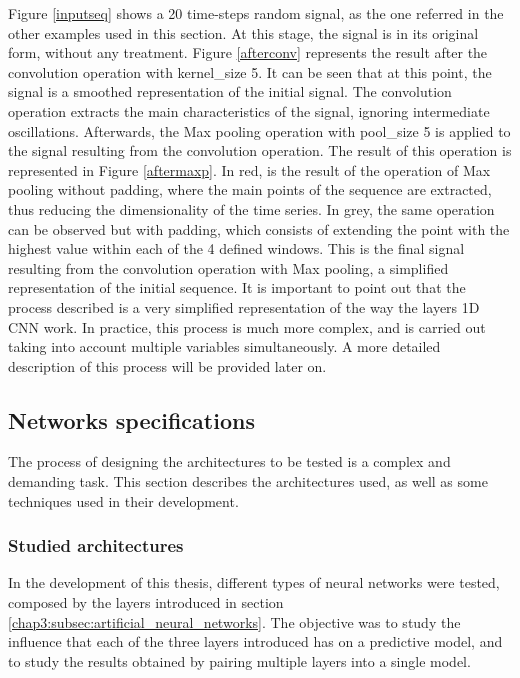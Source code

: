 Figure \ref{inputseq} shows a 20 time-steps random signal, as the one referred in the other examples used in this section. At this stage, the signal is in its original form, without any treatment. Figure \ref{afterconv} represents the result after the convolution operation with kernel\_size 5. It can be seen that at this point, the signal is a smoothed representation of the initial signal. The convolution operation extracts the main characteristics of the signal, ignoring intermediate oscillations. Afterwards, the Max pooling operation with pool\_size 5 is applied to the signal resulting from the convolution operation. The result of this operation is represented in Figure \ref{aftermaxp}. In red, is the result of the operation of Max pooling without padding, where the main points of the sequence are extracted, thus reducing the dimensionality of the time series. In grey, the same operation can be observed but with padding,  which consists of extending the point with the highest value within each of the 4 defined windows. This is the final signal resulting from the convolution operation with Max pooling, a simplified representation of the initial sequence. It is important to point out that the process described is a very simplified representation of the way the layers \ac{1D CNN} work. In practice, this process is much more complex, and is carried out taking into account multiple variables simultaneously. A more detailed description of this process will be provided later on. 

\subsection{Networks specifications}\label{chap3:subsec:networks_specifications}

The process of designing the architectures to be tested is a complex and demanding task. This section describes the architectures used, as well as some techniques used in their development.

\subsubsection{Studied architectures}\label{chap3:subsubsec:studied_architectures}
In the development of this thesis, different types of neural networks were tested, composed by the layers introduced in section \ref{chap3:subsec:artificial_neural_networks}. The objective was to study the influence that each of the three layers introduced has on a predictive model, and to study the results obtained by pairing multiple layers into a single model. 

